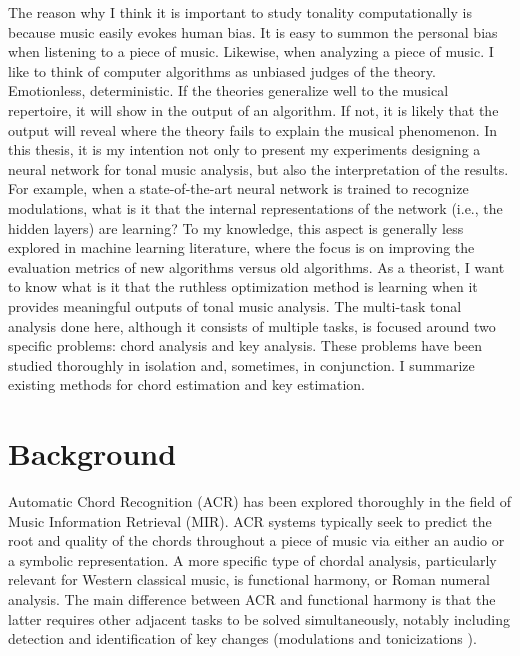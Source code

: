 The reason why I think it is important to study tonality computationally is because music easily evokes human bias.
It is easy to summon the personal bias when listening to a piece of music.
Likewise, when analyzing a piece of music.
I like to think of computer algorithms as unbiased judges of the theory. Emotionless, deterministic.
If the theories generalize well to the musical repertoire, it will show in the output of an algorithm.
If not, it is likely that the output will reveal where the theory fails to explain the musical phenomenon.
In this thesis, it is my intention not only to present my experiments designing a neural network for tonal music analysis, but also the interpretation of the results.
For example, when a state-of-the-art neural network is trained to recognize modulations, what is it that the internal representations of the network (i.e., the hidden layers) are learning?
To my knowledge, this aspect is generally less explored in machine learning literature, where the focus is on improving the evaluation metrics of new algorithms versus old algorithms.
As a theorist, I want to know what is it that the ruthless optimization method is learning when it provides meaningful outputs of tonal music analysis.
The multi-task tonal analysis done here, although it consists of multiple tasks, is focused around two specific problems: chord analysis and key analysis.
These problems have been studied thoroughly in isolation and, sometimes, in conjunction.
I summarize existing methods for chord estimation and key estimation.

\section{Background}

Automatic Chord Recognition (ACR) has been explored thoroughly in the field of Music Information Retrieval (MIR). 
ACR systems typically seek to predict the root and quality of the chords throughout a piece of music via either an audio or a symbolic representation.
A more specific type of chordal analysis, particularly relevant for Western classical music, is functional harmony, or Roman numeral analysis. 
The main difference between ACR and functional harmony is that the latter requires other adjacent tasks to be solved simultaneously, notably including detection and identification of key changes (modulations \cite{feisthauer_estimating_2020, schreiber_local_2020} and tonicizations \cite{napoles_lopez_local_2020}).

